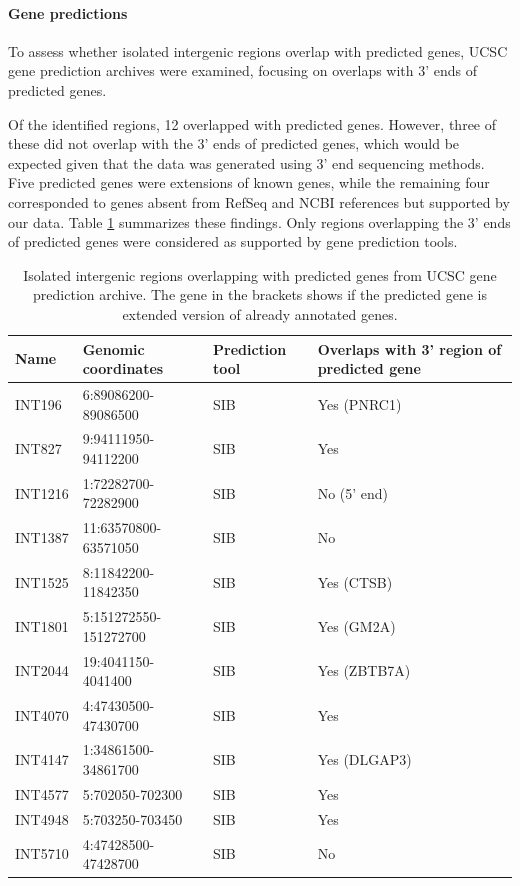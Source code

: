 \paragraph{Gene predictions}

To assess whether isolated intergenic regions overlap with predicted genes, UCSC gene prediction archives were examined,
focusing on overlaps with 3' ends of predicted genes.

Of the identified regions, 12 overlapped with predicted genes.
However, three of these did not overlap with the 3' ends of predicted genes,
which would be expected given that the data was generated using 3' end sequencing methods.
Five predicted genes were extensions of known genes,
while the remaining four corresponded to genes absent from RefSeq and NCBI references but supported by our data.
Table \ref{tab:predictedIsolated} summarizes these findings.
Only regions overlapping the 3' ends of predicted genes were considered as supported by gene prediction tools.

\begin{table}[h]
    \centering
    \begin{tabular}{llll}
        \toprule
        Name & Genomic coordinates & Prediction tool & Overlaps with 3' region of predicted gene \\
        \midrule
	INT196 & 6:89086200-89086500 & SIB & Yes (PNRC1) \\
	INT827 & 9:94111950-94112200 & SIB & Yes \\
	INT1216 & 1:72282700-72282900 & SIB & No (5' end) \\
	INT1387 & 11:63570800-63571050 & SIB & No \\
	INT1525 & 8:11842200-11842350 & SIB & Yes (CTSB) \\
	INT1801 & 5:151272550-151272700 & SIB & Yes (GM2A) \\
	INT2044 & 19:4041150-4041400 & SIB & Yes (ZBTB7A) \\
	INT4070 & 4:47430500-47430700 & SIB & Yes \\
	INT4147 & 1:34861500-34861700 & SIB & Yes (DLGAP3)\\
	INT4577 & 5:702050-702300 & SIB & Yes \\
	INT4948 & 5:703250-703450 & SIB & Yes \\
	INT5710 & 4:47428500-47428700 & SIB & No \\
        \bottomrule
    \end{tabular}
    \caption{Isolated intergenic regions overlapping with predicted genes from UCSC gene prediction archive.
    The gene in the brackets shows if the predicted gene is extended version of already annotated genes.}
    \label{tab:predictedIsolated}
\end{table}

